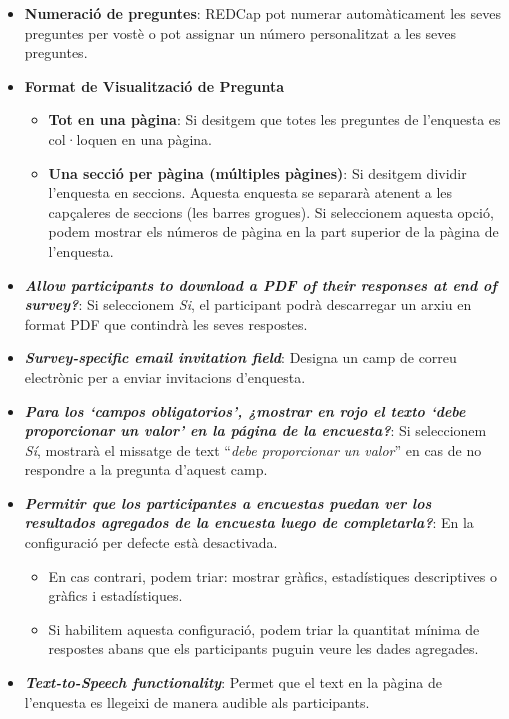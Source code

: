\documentclass[
]{article}
\providecommand{\tightlist}{%
  \setlength{\itemsep}{0pt}\setlength{\parskip}{0pt}}
\begin{document}
\begin{itemize}
\tightlist
\item
  \textbf{Numeració de preguntes}: REDCap pot numerar automàticament les seves preguntes per vostè o pot assignar un número personalitzat a les seves preguntes.
\item
  \textbf{Format de Visualització de Pregunta}

  \begin{itemize}
  \tightlist
  \item
    \textbf{Tot en una pàgina}: Si desitgem que totes les preguntes de l'enquesta es col·loquen en una pàgina.
  \item
    \textbf{Una secció per pàgina (múltiples pàgines)}: Si desitgem dividir l'enquesta en seccions. Aquesta enquesta se separarà atenent a les capçaleres de seccions (les barres grogues). Si seleccionem aquesta opció, podem mostrar els números de pàgina en la part superior de la pàgina de l'enquesta.
  \end{itemize}
\item
  \textbf{\emph{Allow participants to download a PDF of their responses at end of survey?}}: Si seleccionem \emph{Si}, el participant podrà descarregar un arxiu en format PDF que contindrà les seves respostes.
\item
  \textbf{\emph{Survey-specific email invitation field}}: Designa un camp de correu electrònic per a enviar invitacions d'enquesta.
\item
  \textbf{\emph{Para los `campos obligatorios', ¿mostrar en rojo el texto `debe proporcionar un valor' en la página de la encuesta?}}: Si seleccionem \emph{Sí}, mostrarà el missatge de text ``\emph{debe proporcionar un valor}'' en cas de no respondre a la pregunta d'aquest camp.
\item
  \textbf{\emph{Permitir que los participantes a encuestas puedan ver los resultados agregados de la encuesta luego de completarla?}}: En la configuració per defecte està desactivada.

  \begin{itemize}
  \tightlist
  \item
    En cas contrari, podem triar: mostrar gràfics, estadístiques descriptives o gràfics i estadístiques.
  \item
    Si habilitem aquesta configuració, podem triar la quantitat mínima de respostes abans que els participants puguin veure les dades agregades.
  \end{itemize}
\item
  \textbf{\emph{Text-to-Speech functionality}}: Permet que el text en la pàgina de l'enquesta es llegeixi de manera audible als participants.
\end{itemize}
\end{document}
